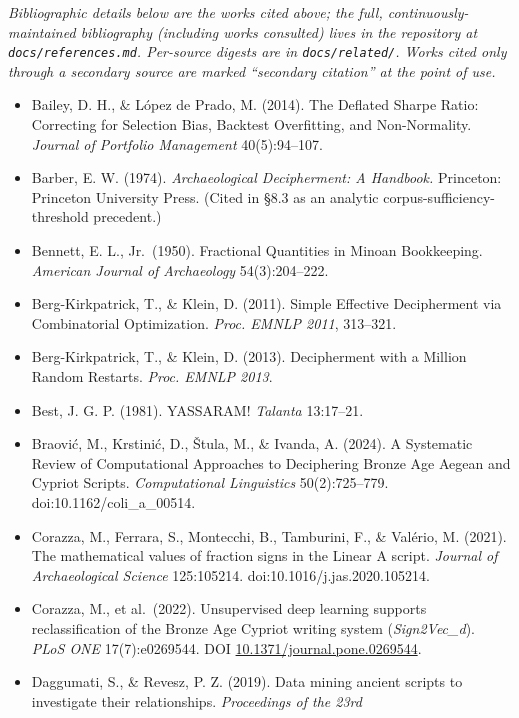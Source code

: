 \documentclass[
  10pt,
]{article}
\providecommand{\tightlist}{%
  \setlength{\itemsep}{0pt}\setlength{\parskip}{0pt}}
\begin{document}
\emph{Bibliographic details below are the works cited above; the full,
continuously-maintained bibliography (including works consulted) lives
in the repository at \texttt{docs/references.md}. Per-source digests are
in \texttt{docs/related/}. Works cited only through a secondary source
are marked ``secondary citation'' at the point of use.}

\begin{itemize}
\tightlist
\item
  Bailey, D. H., \& López de Prado, M. (2014). The Deflated Sharpe
  Ratio: Correcting for Selection Bias, Backtest Overfitting, and
  Non-Normality. \emph{Journal of Portfolio Management} 40(5):94--107.
\item
  Barber, E. W. (1974). \emph{Archaeological Decipherment: A Handbook.}
  Princeton: Princeton University Press. (Cited in §8.3 as an analytic
  corpus-sufficiency-threshold precedent.)
\item
  Bennett, E. L., Jr.~(1950). Fractional Quantities in Minoan
  Bookkeeping. \emph{American Journal of Archaeology} 54(3):204--222.
\item
  Berg-Kirkpatrick, T., \& Klein, D. (2011). Simple Effective
  Decipherment via Combinatorial Optimization. \emph{Proc. EMNLP 2011},
  313--321.
\item
  Berg-Kirkpatrick, T., \& Klein, D. (2013). Decipherment with a Million
  Random Restarts. \emph{Proc. EMNLP 2013}.
\item
  Best, J. G. P. (1981). YASSARAM! \emph{Talanta} 13:17--21.
\item
  Braović, M., Krstinić, D., Štula, M., \& Ivanda, A. (2024). A
  Systematic Review of Computational Approaches to Deciphering Bronze
  Age Aegean and Cypriot Scripts. \emph{Computational Linguistics}
  50(2):725--779. doi:10.1162/coli\_a\_00514.
\item
  Corazza, M., Ferrara, S., Montecchi, B., Tamburini, F., \& Valério, M.
  (2021). The mathematical values of fraction signs in the Linear A
  script. \emph{Journal of Archaeological Science} 125:105214.
  doi:10.1016/j.jas.2020.105214.
\item
  Corazza, M., et al.~(2022). Unsupervised deep learning supports
  reclassification of the Bronze Age Cypriot writing system
  (\emph{Sign2Vec\_d}). \emph{PLoS ONE} 17(7):e0269544. DOI
  \href{https://doi.org/10.1371/journal.pone.0269544}{10.1371/journal.pone.0269544}.
\item
  Daggumati, S., \& Revesz, P. Z. (2019). Data mining ancient scripts to
  investigate their relationships. \emph{Proceedings of the 23rd
}
\end{itemize}
\end{document}
